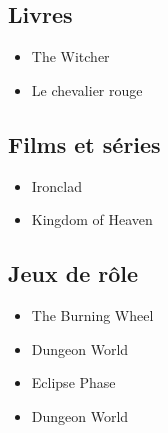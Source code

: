 \documentclass[10pt,a4paper,twocolumn]{book}
\begin{document}
\subsection*{Livres}
\begin{itemize}
\item The Witcher
\item Le chevalier rouge
\end{itemize}
\subsection*{Films et séries}
\begin{itemize}
\item Ironclad
\item Kingdom of Heaven
\end{itemize}
\subsection*{Jeux de rôle}
\begin{itemize}
\item The Burning Wheel
\item Dungeon World
\item Eclipse Phase
\item Dungeon World
\end{itemize}
\tableofcontents
\end{document}
